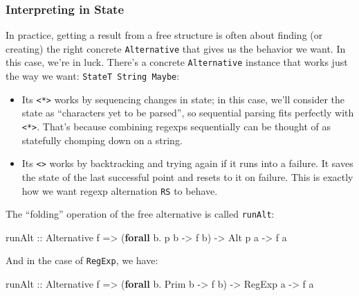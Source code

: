 \documentclass[]{article}
\newenvironment{Shaded}{}{}
\newcommand{\DataTypeTok}[1]{\textcolor[rgb]{0.56,0.13,0.00}{#1}}
\newcommand{\FunctionTok}[1]{\textcolor[rgb]{0.02,0.16,0.49}{#1}}
\newcommand{\KeywordTok}[1]{\textcolor[rgb]{0.00,0.44,0.13}{\textbf{#1}}}
\newcommand{\NormalTok}[1]{#1}
\newcommand{\OtherTok}[1]{\textcolor[rgb]{0.00,0.44,0.13}{#1}}
\begin{document}
\hypertarget{interpreting-in-state}{%
\subsubsection{Interpreting in State}\label{interpreting-in-state}}

In practice, getting a result from a free structure is often about finding (or
creating) the right concrete \texttt{Alternative} that gives us the behavior we
want. In this case, we're in luck. There's a concrete \texttt{Alternative}
instance that works just the way we want: \texttt{StateT\ String\ Maybe}:

\begin{itemize}
\tightlist
\item
  Its \texttt{\textless{}*\textgreater{}} works by sequencing changes in state;
  in this case, we'll consider the state as ``characters yet to be parsed'', so
  sequential parsing fits perfectly with \texttt{\textless{}*\textgreater{}}.
  That's because combining regexps sequentially can be thought of as statefully
  chomping down on a string.
\item
  Its \texttt{\textless{}\textbar{}\textgreater{}} works by backtracking and
  trying again if it runs into a failure. It saves the state of the last
  successful point and resets to it on failure. This is exactly how we want
  regexp alternation \texttt{R\textbar{}S} to behave.
\end{itemize}

The ``folding'' operation of the free alternative is called \texttt{runAlt}:

\begin{Shaded}
\begin{Highlighting}[]
\OtherTok{runAlt ::} \DataTypeTok{Alternative}\NormalTok{ f}
       \OtherTok{=>}\NormalTok{ (}\KeywordTok{forall}\NormalTok{ b}\FunctionTok{.}\NormalTok{ p b }\OtherTok{->}\NormalTok{ f b)}
       \OtherTok{->} \DataTypeTok{Alt}\NormalTok{ p a}
       \OtherTok{->}\NormalTok{ f a}
\end{Highlighting}
\end{Shaded}

And in the case of \texttt{RegExp}, we have:

\begin{Shaded}
\begin{Highlighting}[]
\OtherTok{runAlt ::} \DataTypeTok{Alternative}\NormalTok{ f}
       \OtherTok{=>}\NormalTok{ (}\KeywordTok{forall}\NormalTok{ b}\FunctionTok{.} \DataTypeTok{Prim}\NormalTok{ b }\OtherTok{->}\NormalTok{ f b)}
       \OtherTok{->} \DataTypeTok{RegExp}\NormalTok{ a}
       \OtherTok{->}\NormalTok{ f a}
\end{Highlighting}
\end{Shaded}
\end{document}
